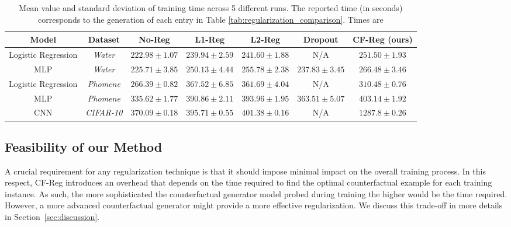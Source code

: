 \begin{table*}[htb!]
    \centering
    \caption{Mean value and standard deviation of training time across 5 different runs. The reported time (in seconds) corresponds to the generation of each entry in Table \ref{tab:regularization_comparison}. Times are }
    \label{tab:times}
    \begin{tabular}{|c|c|c|c|c|c|c|}
        \hline
        \textbf{Model} & \textbf{Dataset} & \textbf{No-Reg} & \textbf{L1-Reg} & \textbf{L2-Reg} & \textbf{Dropout} & \textbf{CF-Reg (ours)} \\ \hline
        Logistic Regression   & \textit{Water}   & $222.98 \pm 1.07$   & $239.94 \pm 2.59$   & $241.60 \pm 1.88$  & N/A    & $251.50 \pm 1.93$                     \\ \hline
        MLP   & \textit{Water}   & $225.71 \pm 3.85$   & $250.13 \pm 4.44$   & $255.78 \pm 2.38$  & $237.83 \pm 3.45$    & $266.48 \pm 3.46$                    \\ \hline
        Logistic Regression   & \textit{Phomene}   & $266.39 \pm 0.82$ & $367.52 \pm 6.85$   & $361.69 \pm 4.04$  & N/A   & $310.48 \pm 0.76$                    \\ \hline
        MLP   &
        \textit{Phomene} & $335.62 \pm 1.77$   & $390.86 \pm 2.11$   & $393.96 \pm 1.95$ & $363.51 \pm 5.07$    & $403.14 \pm 1.92$                     \\ \hline
        CNN   & \textit{CIFAR-10} & $370.09 \pm 0.18$   & $395.71 \pm 0.55$   & $401.38 \pm 0.16$ & N/A    & $1287.8 \pm 0.26$                     \\ \hline
    \end{tabular}
\end{table*}

\subsection{Feasibility of our Method}
A crucial requirement for any regularization technique is that it should impose minimal impact on the overall training process.
In this respect, CF-Reg introduces an overhead that depends on the time required to find the optimal counterfactual example for each training instance. 
As such, the more sophisticated the counterfactual generator model probed during training the higher would be the time required. However, a more advanced counterfactual generator might provide a more effective regularization. We discuss this trade-off in more details in Section~\ref{sec:discussion}.

